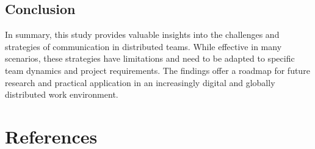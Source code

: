 \documentclass[12pt]{article}
\begin{document}
\subsection{Conclusion}
In summary, this study provides valuable insights into the challenges and strategies of communication in distributed teams. While effective in many scenarios, these strategies have limitations and need to be adapted to specific team dynamics and project requirements. The findings offer a roadmap for future research and practical application in an increasingly digital and globally distributed work environment.


\section*{References}
\vspace*{-35pt}
\renewcommand{\refname}{}
\end{document}
